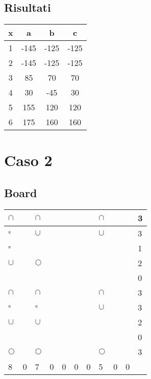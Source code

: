 \documentclass[11pt]{article}
\begin{document}
\subsection{Risultati}
\begin{table}[H]
    \begin{tabular}{|c|c|c|c|}
    \hline
    x & a & b & c \\ \hline \hline
    1 & -145 & -125 & -125 \\ \hline
    2 & -145 & -125 & -125 \\ \hline
    3 & 85 & 70 & 70 \\ \hline
    4 & 30 & -45 & 30 \\ \hline
    5 & 155 & 120 & 120 \\ \hline
    6 & 175 & 160 & 160 \\ \hline
    \end{tabular}
\end{table}

\section{Caso 2}
\subsection{Board}
\begin{table}[H]
    \begin{tabular}{|l|l|l|l|l|l|l|l|l|l||l|}
    \hline
     $\cap$ &  & $\cap$ &  &  &  &  & $\cap$ &  &  & 3 \\ \hline
     $\square$ &  & $\cup$ &  &  &  &  & $\cup$ &  &  & 3 \\ \hline
     $\square$ &  &  &  &  &  &  &  &  &  & 1 \\ \hline
     $\cup$ &  & $\Circle$ &  &  &  &  &  &  &  & 2 \\ \hline
     &  &  &  &  &  &  &  &  &  & 0 \\ \hline
     $\cap$ &  & $\cap$ &  &  &  &  & $\cap$ &  &  & 3 \\ \hline
     $\square$ &  & $\square$ &  &  &  &  & $\cup$ &  &  & 3 \\ \hline
     $\cup$ &  & $\cup$ &  &  &  &  &  &  &  & 2 \\ \hline
     &  &  &  &  &  &  &  &  &  & 0 \\ \hline
     $\Circle$ &  & $\Circle$ &  &  &  &  & $\Circle$ &  &  & 3 \\ \hline \hline
     8 & 0 & 7 & 0 & 0 & 0 & 0 & 5 & 0 & 0 & \\ \hline
    \end{tabular}
\end{table}
\end{document}
